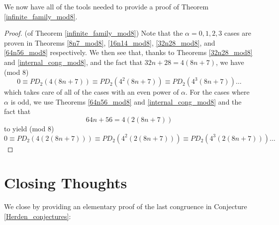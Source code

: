 \documentclass{amsart}
\begin{document}

We now have all of the tools needed to provide a proof of Theorem \ref{infinite_family_mod8}.  
\begin{proof}
(of Theorem \ref{infinite_family_mod8})  Note that the $\alpha=0, 1, 2, 3$ cases are proven in Theorems \ref{8n7_mod8}, \ref{16n14_mod8},  \ref{32n28_mod8}, and \ref{64n56_mod8} respectively.   We then see that, thanks to Theorems \ref{32n28_mod8} and \ref{internal_cong_mod8}, and the fact that $32n+28 = 4(8n+7)$, we have (mod 8)
$$
0 \equiv PD_2(4(8n+7)) \equiv PD_2(4^2(8n+7)) \equiv PD_2(4^3(8n+7)) \dots
$$
which takes care of all of the cases with an even power of $\alpha.$  For the cases where $\alpha$ is odd, we use Theorems \ref{64n56_mod8} and \ref{internal_cong_mod8} and the fact that  
$$64n+56 = 4(2(8n+7))$$ to yield (mod 8) 
$$
0 \equiv PD_2(4(2(8n+7))) \equiv PD_2(4^2(2(8n+7))) \equiv  PD_2(4^3(2(8n+7))) \dots
$$
\end{proof}

\section{Closing Thoughts}
We close by providing an elementary proof of the last congruence in Conjecture \ref{Herden_conjectures}:
\end{document}
